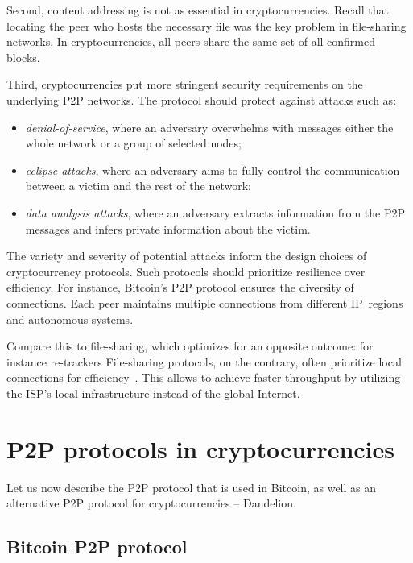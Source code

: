 Second, content addressing is not as essential in cryptocurrencies.
Recall that locating the peer who hosts the necessary file was the key problem in file-sharing networks.
In cryptocurrencies, all peers share the same set of all confirmed blocks.

Third, cryptocurrencies put more stringent security requirements on the underlying P2P networks.
The protocol should protect against attacks such as:%

\begin{itemize}
	\item \textit{denial-of-service}, where an adversary overwhelms with messages either the whole network or a group of selected nodes;
	\item \textit{eclipse attacks}, where an adversary aims to fully control the communication between a victim and the rest of the network;
	\item \textit{data analysis attacks}, where an adversary extracts information from the P2P messages and infers private information about the victim.
\end{itemize}

The variety and severity of potential attacks inform the design choices of cryptocurrency protocols.
Such protocols should prioritize resilience over efficiency.
For instance, Bitcoin's P2P protocol ensures the diversity of connections.
Each peer maintains multiple connections from different IP~regions and autonomous systems.

Compare this to file-sharing, which optimizes for an opposite outcome: for instance re-trackers 
File-sharing protocols, on the contrary, often prioritize local connections for efficiency~\cite{Yoshida2012,Wang2012}.
This allows to achieve faster throughput by utilizing the ISP's local infrastructure instead of the global Internet.


\section{P2P protocols in cryptocurrencies}

Let us now describe the P2P protocol that is used in Bitcoin, as well as an alternative P2P protocol for cryptocurrencies -- Dandelion.

\subsection{Bitcoin P2P protocol}
\label{sec:BitcoinP2PProtocol}

